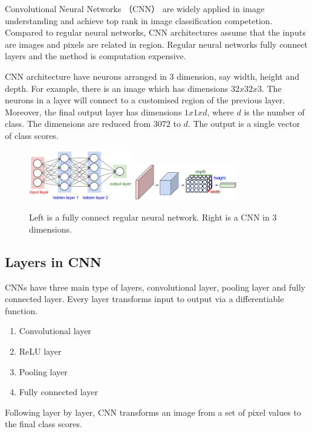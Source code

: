 Convolutional Neural Networks\citep{lecun1998gradient} （CNN） are widely applied in image understanding and achieve top rank in image classification competetion\citep{krizhevsky2012imagenet}. Compared to regular neural networks, CNN architectures assume that the inputs are images and pixels are related in region. Regular neural networks fully connect layers and the method is computation expensive.

CNN architecture have neurons arranged in 3 dimension, say width, height and depth. For example, there is an image which has dimensions $32x32x3$. The neurons in a layer will connect to a customised region of the previous layer. Moreover, the final output layer has dimensions $1x1xd$, where $d$ is the number of class. The dimensions are reduced from $3072$ to $d$. The output is a single vector of class scores.

\graphicspath{ {./Figures/} }
\begin{figure}[!htb]
\centering
\includegraphics[width=0.4\textwidth]{neural_net2.jpeg}
\includegraphics[width=0.4\textwidth]{cnn.jpeg}
\caption{\label{fig:perceptron}Left is a fully connect regular neural network. Right is a CNN in 3 dimensions.}
\end{figure}

\subsection{Layers in CNN}
CNNs have three main type of layers, convolutional layer, pooling layer and fully connected layer. Every layer transforms input to output via a differentiable function. 
\begin{enumerate}
  \item Convolutional layer
  \item ReLU layer
  \item Pooling layer
  \item Fully connected layer
\end{enumerate}
Following layer by layer, CNN transforms an image from a set of pixel values to the final class scores.

